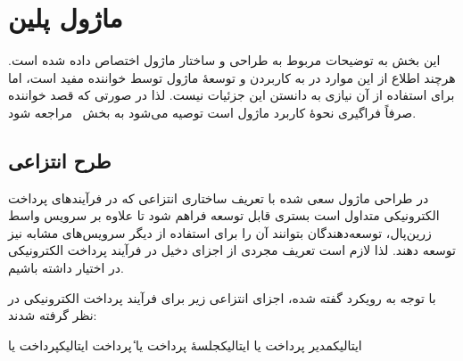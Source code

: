 \section{ماژول ‌پلین{}}
\label{بخش:ماژول}

این بخش به توضیحات مربوط به طراحی و ساختار
ماژول اختصاص داده شده است. هرچند اطلاع از این
موارد در به کاربردن و توسعهٔ ماژول توسط خواننده
مفید است، اما برای استفاده از آن نیازی به
دانستن این جزئیات نیست. لذا در صورتی که قصد
خواننده صرفاً فراگیری نحوهٔ کاربرد ماژول است
توصیه می‌شود به بخش~ مراجعه شود.

\subsection{طرح انتزاعی}
در طراحی ماژول سعی شده با تعریف ساختاری انتزاعی
که در فرآیندهای پرداخت الکترونیکی متداول است
بستری قابل توسعه فراهم شود تا علاوه بر سرویس واسط
زرین‌پال، توسعه‌دهندگان بتوانند آن را برای 
استفاده از دیگر سرویس‌های مشابه نیز توسعه دهند.
لذا لازم است تعریف مجردی از اجزای دخیل در
فرآیند پرداخت الکترونیکی در اختیار داشته باشیم.

با توجه به رویکرد گفته شده، اجزای انتزاعی زیر
برای فرآیند پرداخت الکترونیکی در نظر گرفته شدند:
\begin{itemize}
	 ‌ایتالیک{مدیر پرداخت} یا 
	 ‌ایتالیک{جلسهٔ پرداخت} یا ٔ‌پرداخت{}
	 ‌ایتالیک{پرداخت} یا 
\end{itemize}



